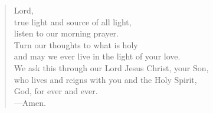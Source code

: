 \prayer

\setlength{\vleftmargin}{\prayerleftmargini}

\begin{verse}
Lord,\\
true light and source of all light,\\
listen to our morning prayer.\\
Turn our thoughts to what is holy\\
and may we ever live in the light of your love.\\
We ask this through our Lord Jesus Christ, your Son,\\
who lives and reigns with you and the Holy Spirit,\\
God, for ever and ever.\\
{\color{red}---\thinspace}Amen.
\end{verse}

\setlength{\vleftmargin}{\defleftmargini}